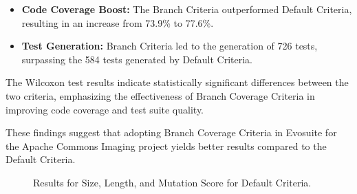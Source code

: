\documentclass[sigconf]{acmart}
\begin{document}
\begin{itemize}
    \item \textbf{Code Coverage Boost:} The Branch Criteria outperformed Default Criteria, resulting in an increase from 73.9\% to 77.6\%.
    \item \textbf{Test Generation:} Branch Criteria led to the generation of 726 tests, surpassing the 584 tests generated by Default Criteria.
\end{itemize}

The Wilcoxon test results indicate statistically significant differences between the two criteria, emphasizing the effectiveness of Branch Coverage Criteria in improving code coverage and test suite quality.

These findings suggest that adopting Branch Coverage Criteria in Evosuite for the Apache Commons Imaging project yields better results compared to the Default Criteria.
\FloatBarrier
\begin{figure}
    \centering
    \caption{Results for Size, Length, and Mutation Score for Default Criteria.}
\end{figure}
\end{document}
